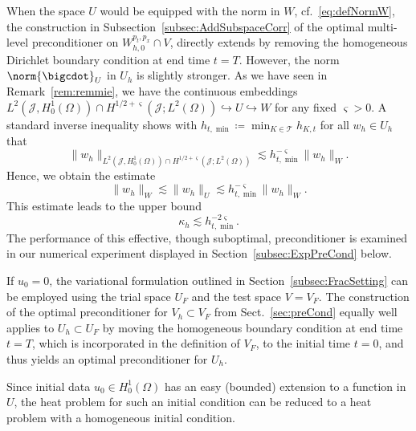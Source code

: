 \documentclass{amsart}
\providecommand{\tria}{\mathcal{T}}
\newcommand{\cJ}{\mathcal J}
\begin{document}
When the space $U$ would be equipped with the norm in $W$, cf.~\eqref{eq:defNormW}, the construction in Subsection~\ref{subsec:AddSubspaceCorr} of the optimal multi-level preconditioner on $W_{h,0}^{p_t,p_x} \cap V$, directly extends by removing the homogeneous Dirichlet boundary condition at end time $t=T$.
%
However, the norm $\norm{\bigcdot}_U$ in $U_h$ is slightly stronger. As we have seen in Remark~\ref{rem:remmie}, we have the continuous embeddings
$L^2(\cJ,H^1_0(\Omega)) \cap H^{1/2+\varsigma}(\cJ;L^2(\Omega)) \hookrightarrow U \hookrightarrow W$  for any fixed $\varsigma>0$.
A standard inverse inequality shows with $h_{t,\min}\coloneqq \min_{K \in \tria} h_{K,t}$ for all $w_h \in U_h$ that 
\begin{equation*}
\|w_h\|_{L^2(\cJ,H^1_0(\Omega)) \cap H^{1/2+\varsigma}(\cJ;L^2(\Omega))} \lesssim h_{t,\min}^{-\varsigma} \|w_h\|_W.
\end{equation*}
Hence, we obtain the estimate
\begin{equation} \label{eq:inequalities}
\|w_h\|_W \lesssim \|w_h\|_U \lesssim h_{t,\min}^{-\varsigma} \|w_h\|_W.
\end{equation}
This estimate leads to the upper bound
\begin{equation*}
\kappa_h \lesssim h_{t,\min}^{-2\varsigma}.
\end{equation*}
% 
The performance of this effective, though suboptimal, preconditioner is examined in our numerical experiment displayed in Section~\ref{subsec:ExpPreCond} below.
%
\begin{remark}
If $u_0 =0$, the variational formulation outlined in Section~\ref{subsec:FracSetting} can be employed using the trial space \( U_F \) and the test space \( V=V_F \). 
The construction of the optimal preconditioner for $V_h \subset V_F$ from Sect.~\ref{sec:preCond} equally well applies to $U_h \subset U_F$ by moving the homogeneous boundary condition at end time $t=T$, which is incorporated in the definition of $V_F$, to the initial time $t=0$, and thus yields an optimal preconditioner for $U_h$.

Since initial data $u_0 \in H^1_0(\Omega)$ has an easy (bounded) extension to a function in $U$, the heat problem for such an initial condition can be reduced to a heat problem with a homogeneous initial condition. 
\end{remark}
%
\end{document}
